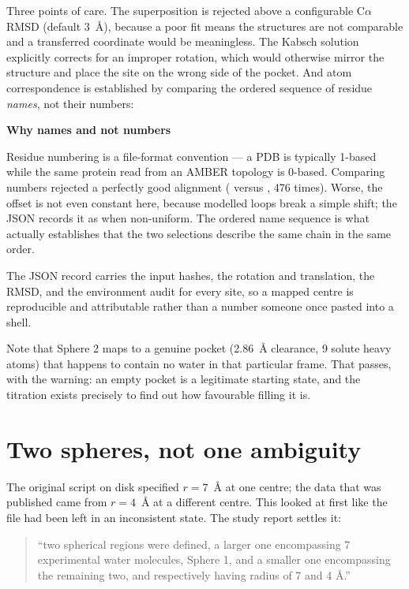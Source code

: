 \documentclass[11pt]{article}
\newcommand{\code}[1]{\texttt{\detokenize{#1}}}
\newenvironment{note}[1]{%
  \begin{lrbox}{\gpbox}\begin{minipage}{0.94\linewidth}%
  \textbf{\textcolor{blue!45!black}{#1}}\par\smallskip\small}%
 {\end{minipage}\end{lrbox}%
  \begin{center}\setlength{\fboxrule}{0.7pt}%
  \fcolorbox{blue!45!black}{blue!4}{\usebox{\gpbox}}\end{center}}
\begin{document}
Three points of care. The superposition is rejected above a configurable C$\alpha$ RMSD
(default 3~\AA{}), because a poor fit means the structures are not comparable and a
transferred coordinate would be meaningless. The Kabsch solution explicitly corrects for an
improper rotation, which would otherwise mirror the structure and place the site on the wrong
side of the pocket. And atom correspondence is established by comparing the ordered sequence
of residue \emph{names}, not their numbers:

\begin{note}{Why names and not numbers}
Residue numbering is a file-format convention --- a PDB is typically 1-based while the same
protein read from an AMBER topology is 0-based. Comparing numbers rejected a perfectly good
alignment (\code{GLY1} versus \code{GLY0}, 476 times). Worse, the offset is not even
constant here, because modelled loops break a simple shift; the JSON records it as
\code{null} when non-uniform. The ordered name sequence is what actually establishes that
the two selections describe the same chain in the same order.
\end{note}

The JSON record carries the input hashes, the rotation and translation, the RMSD, and the
environment audit for every site, so a mapped centre is reproducible and attributable rather
than a number someone once pasted into a shell.

Note that Sphere 2 maps to a genuine pocket (2.86~\AA{} clearance, 9 solute heavy atoms) that
happens to contain no water in that particular frame. That passes, with the warning: an
empty pocket is a legitimate starting state, and the titration exists precisely to find out
how favourable filling it is.

\section{Two spheres, not one ambiguity}\label{sec:spheres}

The original script on disk specified $r=7$~\AA{} at one centre; the data that was published
came from $r=4$~\AA{} at a different centre. This looked at first like the file had been left
in an inconsistent state. The study report settles it:

\begin{quote}\small
``two spherical regions were defined, a larger one encompassing 7 experimental water
molecules, Sphere 1, and a smaller one encompassing the remaining two, and respectively
having radius of 7 and 4 \AA{}.''
\end{quote}
\end{document}
